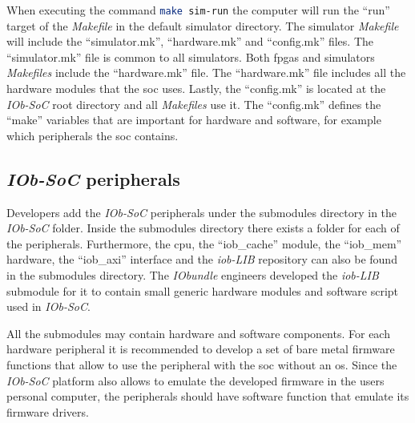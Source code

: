 When executing the command \lstinline[language=bash]{make sim-run} the computer will run the \enquote{run} target of the \textit{Makefile} in the default simulator directory. The simulator \textit{Makefile} will include the \enquote{simulator.mk}, \enquote{hardware.mk} and \enquote{config.mk} files. The \enquote{simulator.mk} file is common to all simulators. Both \acrshort{fpga}s and simulators \textit{Makefiles} include the \enquote{hardware.mk} file. The \enquote{hardware.mk} file includes all the hardware modules that the \acrshort{soc} uses. Lastly, the \enquote{config.mk} is located at the \textit{IOb-SoC} root directory and all \textit{Makefiles} use it. The \enquote{config.mk} defines the \enquote{make} variables that are important for hardware and software, for example which peripherals the \acrshort{soc} contains.

\subsection{\textit{IOb-SoC} peripherals}
Developers add the \textit{IOb-SoC} peripherals under the submodules directory in the \textit{IOb-SoC} folder. Inside the submodules directory there exists a folder for each of the peripherals. Furthermore, the \acrshort{cpu}, the \enquote{iob_cache} module, the \enquote{iob_mem} hardware, the \enquote{iob_axi} interface and the \textit{iob-LIB} repository can also be found in the submodules directory. The \textit{IObundle} engineers developed the \textit{iob-LIB} submodule for it to contain small generic hardware modules and software script used in \textit{IOb-SoC}.

All the submodules may contain hardware and software components. For each hardware peripheral it is recommended to develop a set of bare metal firmware functions that allow to use the peripheral with the \acrshort{soc} without an \acrshort{os}. Since the \textit{IOb-SoC} platform also allows to emulate the developed firmware in the users personal computer, the peripherals should have software function that emulate its firmware drivers.

